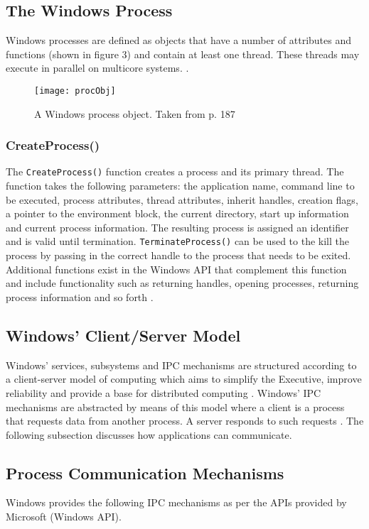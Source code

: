 \documentclass[12pt,a4paper,oneside]{article}
\def\code#1{\texttt{#1}}
\begin{document}
  \subsection{The Windows Process}
    Windows processes are defined as objects that have a number of attributes and functions (shown in figure 3) and contain at least one thread. These threads may execute in parallel on multicore systems. \citep{OSInternals&DesignPrinciplesStallings}.

  \begin{figure}[H]
  \texttt{[image: procObj]}
  \label{fig:procObj}
  \caption{A Windows process object. Taken from \cite{OSInternals&DesignPrinciplesStallings} p. 187}
  \end{figure}

  \subsubsection{CreateProcess()}
    The \code{CreateProcess()} function creates a process and its primary thread. The function takes the following parameters: the application name, command line to be executed, process attributes, thread attributes, inherit handles, creation flags, a pointer to the environment block, the current directory, start up information and current process information. The resulting process is assigned an identifier and is valid until termination. \code{TerminateProcess()} can be used to the kill the process by passing in the correct handle to the process that needs to be exited. Additional functions exist in the Windows API that complement this function and include functionality such as returning handles, opening processes, returning process information and so forth \citep{MSDN_API}.

  \subsection{Windows' Client/Server Model}
    Windows' services, subsystems and IPC mechanisms are structured according to a client-server model of computing which aims to simplify the Executive, improve reliability and provide a base for distributed computing \citep{OSInternals&DesignPrinciplesStallings}. Windows' IPC mechanisms are abstracted by means of this model where a client is a process that requests data from another process. A server responds to such requests \citep{MSDN_IPCExplanation}. The following subsection discusses how applications can communicate.
  \subsection{Process Communication Mechanisms}
    Windows provides the following IPC mechanisms as per the APIs provided by Microsoft (Windows API).
\end{document}
